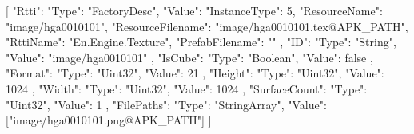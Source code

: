 [{
        "Rtti": {
            "Type": "FactoryDesc",
            "Value": {
                "InstanceType": 5,
                "ResourceName": "image/hga0010101",
                "ResourceFilename": "image/hga0010101.tex@APK_PATH",
                "RttiName": "En.Engine.Texture",
                "PrefabFilename": ""
            }
        },
        "ID": {
            "Type": "String",
            "Value": "image/hga0010101"
        },
        "IsCube": {
            "Type": "Boolean",
            "Value": false
        },
        "Format": {
            "Type": "Uint32",
            "Value": 21
        },
        "Height": {
            "Type": "Uint32",
            "Value": 1024
        },
        "Width": {
            "Type": "Uint32",
            "Value": 1024
        },
        "SurfaceCount": {
            "Type": "Uint32",
            "Value": 1
        },
        "FilePaths": {
            "Type": "StringArray",
            "Value": ["image/hga0010101.png@APK_PATH"]
        }
    }]